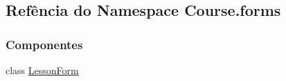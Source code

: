 \hypertarget{namespaceCourse_1_1forms}{\subsection{Refência do Namespace Course.\-forms}
\label{namespaceCourse_1_1forms}
}
\subsubsection*{Componentes}
\begin{DoxyCompactItemize}
\item 
class \hyperlink{classCourse_1_1forms_1_1LessonForm}{Lesson\-Form}
\end{DoxyCompactItemize}
